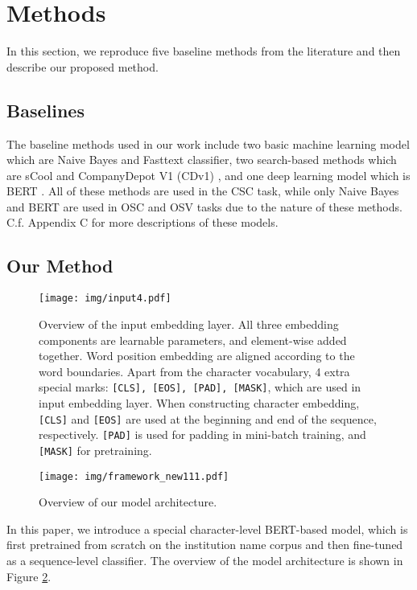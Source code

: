 \documentclass{article}
\begin{document}
\section{Methods}
In this section, we reproduce five baseline methods from the literature and then describe our proposed method. 

\subsection{Baselines}
The baseline methods used in our work include two basic machine learning model which are Naive Bayes \cite{maron1961automatic} and Fasttext \cite{joulin2016bag} classifier, two search-based methods which are sCool \cite{jacob2014scool} and CompanyDepot V1 (CDv1) \cite{liu2016companydepot}, and one deep learning model which is BERT \cite{DBLP:conf/naacl/DevlinCLT19}. All of these methods are used in the CSC task, while only Naive Bayes and BERT are used in OSC and OSV tasks due to the nature of these methods. C.f. Appendix C for more descriptions of these models. 

\subsection{Our Method}

\begin{figure}[t]
    \centering
    \texttt{[image: img/input4.pdf]}
    \caption{Overview of the input embedding layer. All three embedding components are learnable parameters, and element-wise added together. Word position embedding are aligned according to the word boundaries. Apart from the character vocabulary, 4 extra special marks: \texttt{[CLS], \texttt{[EOS]}, \texttt{[PAD]}, \texttt{[MASK]}}, which are used in input embedding layer. When constructing character embedding, \texttt{[CLS]} and \texttt{[EOS]} are used at the beginning and end of the sequence, respectively. \texttt{[PAD]} is used for padding in mini-batch training, and \texttt{[MASK]} for pretraining. }
    \label{fig:input}
\end{figure}

\begin{figure}[t]
    \centering
    \texttt{[image: img/framework\_new111.pdf]}
    \caption{Overview of our model architecture.}
    \label{fig:model}
\end{figure}


In this paper, we introduce a special character-level BERT-based model, which is first pretrained from scratch on the institution name corpus and then fine-tuned as a sequence-level classifier. The overview of the model architecture is shown in Figure \ref{fig:model}.
\end{document}
